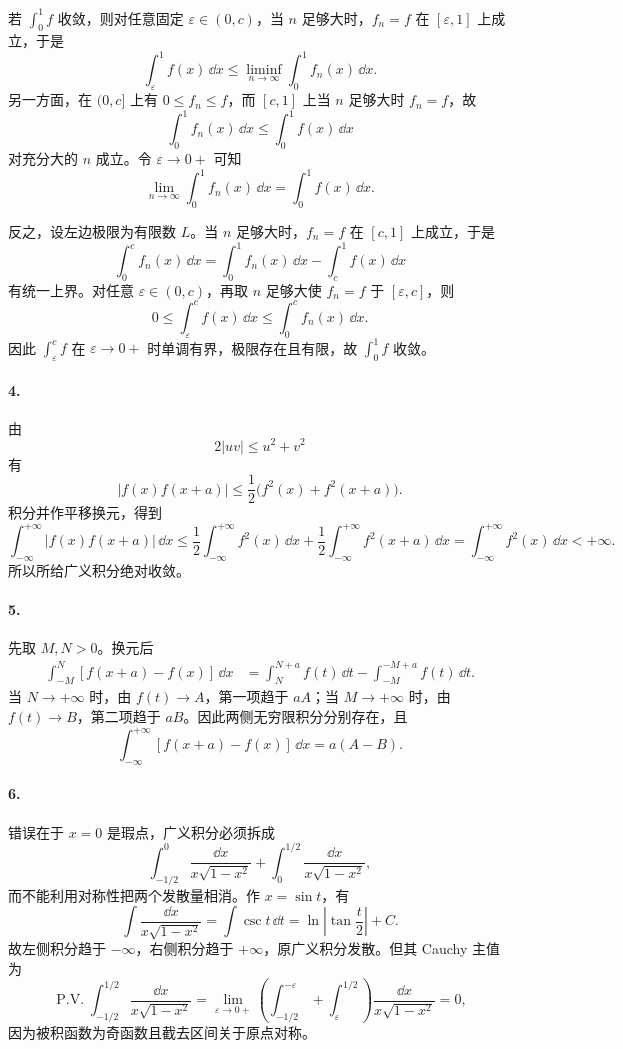 若 $\int_0^1f$ 收敛，则对任意固定 $\varepsilon\in(0,c)$，当 $n$ 足够大时，$f_n=f$ 在 $[\varepsilon,1]$ 上成立，于是
\[
  \int_\varepsilon^1f(x)\,\dd x
  \leq \liminf_{n\to\infty}\int_0^1 f_n(x)\,\dd x.
\]
另一方面，在 $(0,c]$ 上有 $0\leq f_n\leq f$，而 $[c,1]$ 上当 $n$ 足够大时 $f_n=f$，故
\[
  \int_0^1 f_n(x)\,\dd x\leq \int_0^1 f(x)\,\dd x
\]
对充分大的 $n$ 成立。令 $\varepsilon\to0+$ 可知
\[
  \lim_{n\to\infty}\int_0^1f_n(x)\,\dd x=\int_0^1f(x)\,\dd x.
\]

反之，设左边极限为有限数 $L$。当 $n$ 足够大时，$f_n=f$ 在 $[c,1]$ 上成立，于是
\[
  \int_0^c f_n(x)\,\dd x
  =\int_0^1f_n(x)\,\dd x-\int_c^1f(x)\,\dd x
\]
有统一上界。对任意 $\varepsilon\in(0,c)$，再取 $n$ 足够大使 $f_n=f$ 于 $[\varepsilon,c]$，则
\[
  0\leq\int_\varepsilon^c f(x)\,\dd x
  \leq\int_0^c f_n(x)\,\dd x.
\]
因此 $\int_\varepsilon^c f$ 在 $\varepsilon\to0+$ 时单调有界，极限存在且有限，故 $\int_0^1f$ 收敛。

\paragraph{4.}
由
\[
  2|uv|\leq u^2+v^2
\]
有
\[
  |f(x)f(x+a)|\leq\frac12\bigl(f^2(x)+f^2(x+a)\bigr).
\]
积分并作平移换元，得到
\[
  \int_{-\infty}^{+\infty}|f(x)f(x+a)|\,\dd x
  \leq\frac12\int_{-\infty}^{+\infty}f^2(x)\,\dd x
  +\frac12\int_{-\infty}^{+\infty}f^2(x+a)\,\dd x
  =\int_{-\infty}^{+\infty}f^2(x)\,\dd x<+\infty.
\]
所以所给广义积分绝对收敛。

\paragraph{5.}
先取 $M,N>0$。换元后
\begin{align*}
  \int_{-M}^{N}[f(x+a)-f(x)]\,\dd x
  &=\int_{N}^{N+a}f(t)\,\dd t-\int_{-M}^{-M+a}f(t)\,\dd t.
\end{align*}
当 $N\to+\infty$ 时，由 $f(t)\to A$，第一项趋于 $aA$；当 $M\to+\infty$ 时，由 $f(t)\to B$，第二项趋于 $aB$。因此两侧无穷限积分分别存在，且
\[
  \int_{-\infty}^{+\infty}[f(x+a)-f(x)]\,\dd x=a(A-B).
\]

\paragraph{6.}
错误在于 $x=0$ 是瑕点，广义积分必须拆成
\[
  \int_{-1/2}^{0}\frac{\dd x}{x\sqrt{1-x^2}}
  +\int_{0}^{1/2}\frac{\dd x}{x\sqrt{1-x^2}},
\]
而不能利用对称性把两个发散量相消。作 $x=\sin t$，有
\[
  \int\frac{\dd x}{x\sqrt{1-x^2}}=\int\csc t\,\dd t
  =\ln\left|\tan\frac t2\right|+C.
\]
故左侧积分趋于 $-\infty$，右侧积分趋于 $+\infty$，原广义积分发散。但其 Cauchy 主值为
\[
  \operatorname{P.V.}\int_{-1/2}^{1/2}\frac{\dd x}{x\sqrt{1-x^2}}
  =\lim_{\varepsilon\to0+}
  \left(\int_{-1/2}^{-\varepsilon}+\int_{\varepsilon}^{1/2}\right)
  \frac{\dd x}{x\sqrt{1-x^2}}=0,
\]
因为被积函数为奇函数且截去区间关于原点对称。

